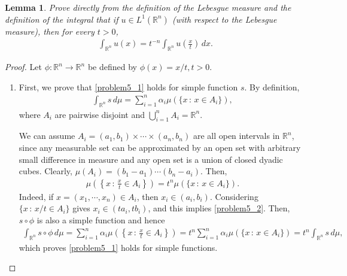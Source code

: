 \documentclass[11pt]{book}
\newtheorem{lemma}{Lemma}[chapter]
\theoremstyle{definition}
\numberwithin{equation}{chapter}
\begin{document}
\begin{lemma}\label{lemma_42}
Prove directly from the definition of the Lebesgue measure and the definition of the integral that if $u \in L^1(\mathbb{R}^n)$ (with respect to the Lebesgue measure), then for every $t > 0$,
\begin{align}\label{problem5_1}
    \int_{\mathbb{R}^n} u(x) = t^{-n} \int_{\mathbb{R}^n} u \left(\frac{x}{t}\right) \,dx.  
\end{align}
\end{lemma}
\begin{proof}
Let $\phi: \mathbb{R}^n \to \mathbb{R}^n$ be defined by $\phi(x) = x/t, t > 0$.
\begin{enumerate}[label=(\alph*)]
    \item First, we prove that \eqref{problem5_1} holds for simple function $s$. By definition,
    \begin{align*}
        \int_{\mathbb{R}^n} s\,d\mu = \sum^n_{i=1} \alpha_i \mu(\{ x \,:\, x \in A_i\}),
    \end{align*}
    where $A_i$ are pairwise disjoint and $\bigcup^n_{i=1}A_i = \mathbb{R}^n$. 

    We can assume $A_i = (a_1,b_1) \times \cdots \times (a_n,b_n)$ are all open intervals in $\mathbb{R}^n$, since any measurable set can be approximated by an open set with arbitrary small difference in measure and any open set is a union of closed dyadic cubes. Clearly, $\mu(A_i) = (b_1 - a_1) \cdots (b_n - a_i)$. Then,
    \begin{align}\label{problem5_2}
        \mu \left( \left\{x \,:\, \frac{x}{t} \in A_i \right\} \right) = t^n \mu(\{ x \,:\, x \in A_i\}).
    \end{align}
    Indeed, if $x = (x_1,\cdots,x_n) \in A_i$, then $x_i \in (a_i,b_i)$. Considering $\{x \,:\, x/t \in A_i\}$ gives $x_i \in (ta_i,tb_i)$, and this implies \eqref{problem5_2}. Then, $s \circ \phi$ is also a simple function and hence
    \begin{align*}
        \int_{\mathbb{R}^n} s \circ \phi\,d\mu = \sum^n_{i=1} \alpha_i \mu \left( \left\{x \,:\, \frac{x}{t} \in A_i \right\} \right) = t^n \sum^n_{i=1} \alpha_i \mu(\{ x \,:\, x \in A_i\}) = t^n \int_{\mathbb{R}^n} s\,d\mu,
    \end{align*}
    which proves \eqref{problem5_1} holds for simple functions.\label{problem5_part_a}
    

\end{enumerate}
\end{proof}
\end{document}
